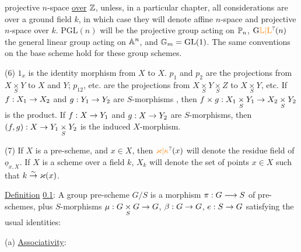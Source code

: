 projective $n$-space \uline{over} \uline{$\mathbb Z$}, unless, in a particular chapter, all considerations are over a ground field $k$, in which case they will denote affine $n$-space and projective $n$-space over $k$. $\mathrm{PGL}(n)$ will be the projective group acting on $\mathbb P_n$, $\mathrm{G}\unsure{\mathbb L|\mathrm L}(n)$ the general linear group acting on $\mathbb A^{n}$, and $\mathbb G_m=\mathrm{GL}(1)$. The same conventions on the base scheme hold for these group schemes.

(6) $1_x$ is the identity morphism from $X$ to $X$. $p_1$ and $p_2$ are the projections from $X\underset{S}{\times}Y$ to $X$ and $Y$; $p_{12}$, etc. are the projections from $X\underset{S}{\times}Y\underset{S}{\times}Z$ to $X\underset{S}{\times}Y$, etc. If $f:X_1\to X_2$ and $g:Y_1\to Y_2$ are $S$-morphisms , then $f\times g:X_1\underset{S}{\times}Y_1\to X_2\underset{S}{\times}Y_2$ is the product. If $f:X\to Y_1$ and $g:X\to Y_2$ are $S$-morphisms, then $(f,g):X\to Y_1\underset{S}{\times}Y_2$ is the induced $X$-morphism.

(7) If $X$ is a pre-scheme, and $x\in X$, then $\handwritten{\unsure{\varkappa|\kappa}}(x)$ will denote the residue field of $\underline{o}_{x,X}$. If $X$ is a scheme over a field $k$, $X_k$ will denote the set of points $x\in X$ such that $k\overset{\sim}{\to}\varkappa(x)$.

 \uline{Definition} \uline{0.1}: A group pre-scheme $G/S$ is a morphism $\pi:G\longrightarrow S$ of pre-schemes, plus $S$-morphisms $\mu:G\underset{S}{\times}G\to G$, $\beta:G\to G$, $e:S\to G$ satisfying the usual identities:

(a) \uline{Associativity}:


